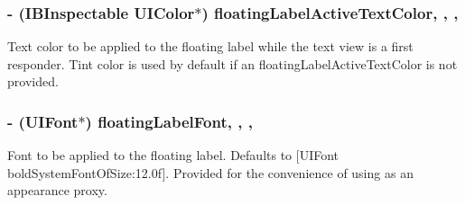 \subsubsection[{floating\+Label\+Active\+Text\+Color}]{\setlength{\rightskip}{0pt plus 5cm}-\/ (I\+B\+Inspectable U\+I\+Color$\ast$) floating\+Label\+Active\+Text\+Color\hspace{0.3cm}{\ttfamily [read]}, {\ttfamily [write]}, {\ttfamily [nonatomic]}, {\ttfamily [strong]}}\label{interface_j_v_float_labeled_text_view_aeafbd8422f4d37317d1dc65c5827d884}
Text color to be applied to the floating label while the text view is a first responder. Tint color is used by default if an {\ttfamily floating\+Label\+Active\+Text\+Color} is not provided. \hypertarget{interface_j_v_float_labeled_text_view_a714359739c5a39e8bcd9dbc4cade6972}{}
\subsubsection[{floating\+Label\+Font}]{\setlength{\rightskip}{0pt plus 5cm}-\/ (U\+I\+Font$\ast$) floating\+Label\+Font\hspace{0.3cm}{\ttfamily [read]}, {\ttfamily [write]}, {\ttfamily [nonatomic]}, {\ttfamily [strong]}}\label{interface_j_v_float_labeled_text_view_a714359739c5a39e8bcd9dbc4cade6972}
Font to be applied to the floating label. Defaults to {\ttfamily \mbox{[}U\+I\+Font bold\+System\+Font\+Of\+Size\+:12.\+0f\mbox{]}}. Provided for the convenience of using as an appearance proxy. \hypertarget{interface_j_v_float_labeled_text_view_a62884c0e053aaf577df9c10b111d164e}{}
